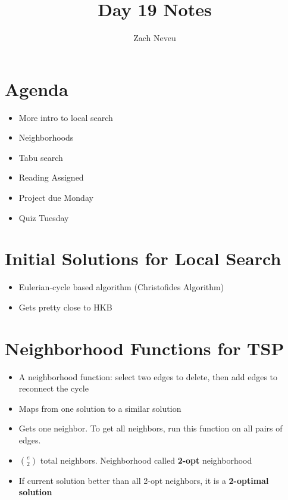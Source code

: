 \documentclass[12pt, letter]{article}
\author{Zach Neveu}
\title{ Day 19 Notes }
\begin{document}
\maketitle
\section{Agenda}%
\label{sec:agenda}
\begin{itemize}
	\item More intro to local search
	\item Neighborhoods
	\item Tabu search
	\item Reading Assigned
	\item Project due Monday
	\item Quiz Tuesday
\end{itemize}

\section{Initial Solutions for Local Search}%
\begin{itemize}
	\item Eulerian-cycle based algorithm (Christofides Algorithm)
	\item Gets pretty close to HKB
\end{itemize}

\section{Neighborhood Functions for TSP}%
\begin{itemize}
	\item A neighborhood function: select two edges to delete, then add edges to reconnect the cycle
	\item Maps from one solution to a similar solution
	\item Gets one neighbor. To get all neighbors, run this function on all pairs of edges.
	\item $e\choose{2}$ total neighbors. Neighborhood called \textbf{2-opt} neighborhood
	\item If current solution better than all 2-opt neighbors, it is a \textbf{2-optimal solution} 
\end{itemize}
\end{document}
